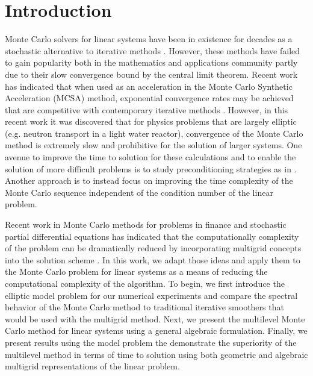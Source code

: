\documentclass[note]{TechNote}
\begin{document}
\section{Introduction}
\label{sec:introduction}
Monte Carlo solvers for linear systems have been in existence for
decades as a stochastic alternative to iterative methods
\cite{forsythe_matrix_1950,wasow_note_1952,halton_sequential_1962,hammersley_monte_1964,spanier_monte_1969}. However,
these methods have failed to gain popularity both in the mathematics
and applications community partly due to their slow convergence bound
by the central limit theorem. Recent work has indicated that when used
as an acceleration in the Monte Carlo Synthetic Acceleration (MCSA)
method, exponential convergence rates may be achieved that are
competitive with contemporary iterative methods
\cite{evans_residual_2003,evans_monte_2009,evans_monte_2012,slattery_phd_2013}.
However, in this recent work it was discovered that for physics
problems that are largely elliptic (e.g. neutron transport in a light
water reactor), convergence of the Monte Carlo method is extremely
slow and prohibitive for the solution of larger systems. One avenue to
improve the time to solution for these calculations and to enable the
solution of more difficult problems is to study preconditioning
strategies as in \cite{slattery_phd_2013}. Another approach is to
instead focus on improving the time complexity of the Monte Carlo
sequence independent of the condition number of the linear problem.

Recent work in Monte Carlo methods for problems in finance and
stochastic partial differential equations has indicated that the
computationally complexity of the problem can be dramatically reduced
by incorporating multigrid concepts into the solution scheme
\cite{heinrich_2001,giles_2008,cliffe_2011}. In this work, we adapt
those ideas and apply them to the Monte Carlo problem for linear
systems as a means of reducing the computational complexity of the
algorithm. To begin, we first introduce the elliptic model problem for
our numerical experiments and compare the spectral behavior of the
Monte Carlo method to traditional iterative smoothers that would be
used with the multigrid method. Next, we present the multilevel Monte
Carlo method for linear systems using a general algebraic
formulation. Finally, we present results using the model problem the
demonstrate the superiority of the multilevel method in terms of time
to solution using both geometric and algebraic multigrid
representations of the linear problem.
\end{document}
